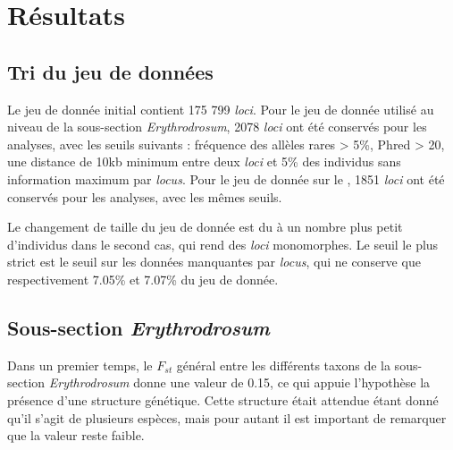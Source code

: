 \section{Résultats}

\subsection{Tri du jeu de données}

Le jeu de donnée initial contient 175 799 \textit{loci}. Pour le jeu de donnée utilisé au niveau de la sous-section \textit{Erythrodrosum}, 2078 \textit{loci} ont été conservés pour les analyses, avec les seuils suivants : fréquence des allèles rares > 5\%, Phred > 20, une distance de 10kb minimum entre deux \textit{loci} et 5\% des individus sans information maximum par \textit{locus}.
Pour le jeu de donnée sur le , 1851 \textit{loci} ont été conservés pour les analyses, avec les mêmes seuils.

Le changement de taille du jeu de donnée est du à un nombre plus petit d'individus dans le second cas, qui rend des \textit{loci} monomorphes. Le seuil le plus strict est le seuil sur les données manquantes par \textit{locus}, qui ne conserve que  respectivement 7.05\% et 7.07\% du jeu de donnée. 

\subsection{Sous-section \textit{Erythrodrosum}}

Dans un premier temps, le $F_{st}$ général entre les différents taxons de la sous-section \textit{Erythrodrosum} donne une valeur de 0.15, ce qui appuie l'hypothèse la présence d'une structure génétique. Cette structure était attendue étant donné qu'il s'agit de plusieurs espèces, mais pour autant il est important de remarquer que la valeur reste faible.

